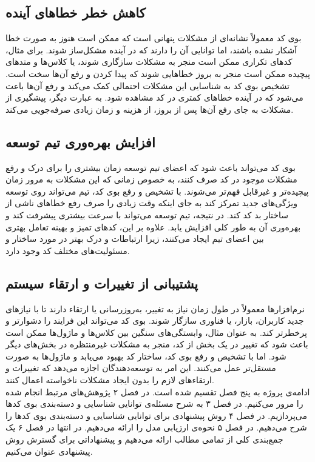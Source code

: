 \subsection{کاهش خطر خطاهای آینده}
بوی کد معمولاً نشانه‌ای از مشکلات پنهانی است که ممکن است هنوز به صورت خطا آشکار نشده باشند، اما توانایی آن را دارند که در آینده مشکل‌ساز شوند. برای مثال، کدهای تکراری ممکن است منجر به مشکلات سازگاری شوند، یا کلاس‌ها و متدهای پیچیده ممکن است منجر به بروز خطاهایی شوند که پیدا کردن و رفع آن‌ها سخت است. تشخیص بوی کد به شناسایی این مشکلات احتمالی کمک می‌کند و رفع آن‌ها باعث می‌شود که در آینده خطاهای کمتری در کد مشاهده شود. به عبارت دیگر، پیشگیری از مشکلات به جای رفع آن‌ها پس از بروز، از هزینه و زمان زیادی صرفه‌جویی می‌کند.
\subsection{افزایش بهره‌وری تیم توسعه}
بوی کد می‌تواند باعث شود که اعضای تیم توسعه زمان بیشتری را برای درک و رفع مشکلات موجود در کد صرف کنند، به خصوص زمانی که این مشکلات به مرور زمان پیچیده‌تر و غیرقابل فهم‌تر می‌شوند. با تشخیص و رفع بوی کد، تیم می‌تواند روی توسعه ویژگی‌های جدید تمرکز کند به جای اینکه وقت زیادی را صرف رفع خطاهای ناشی از ساختار بد کد کند. در نتیجه، تیم توسعه می‌تواند با سرعت بیشتری پیشرفت کند و بهره‌وری آن به طور کلی افزایش یابد. علاوه بر این، کدهای تمیز و بهینه تعامل بهتری بین اعضای تیم ایجاد می‌کنند، زیرا ارتباطات و درک بهتر در مورد ساختار و مسئولیت‌های مختلف کد وجود دارد.
\subsection {پشتیبانی از تغییرات و ارتقاء سیستم}
نرم‌افزارها معمولاً در طول زمان نیاز به تغییر، به‌روزرسانی یا ارتقاء دارند تا با نیازهای جدید کاربران، بازار، یا فناوری سازگار شوند. بوی کد می‌تواند این فرایند را دشوارتر و پرخطرتر کند. به عنوان مثال، وابستگی‌های سنگین بین کلاس‌ها و ماژول‌ها ممکن است باعث شود که تغییر در یک بخش از کد، منجر به مشکلات غیرمنتظره در بخش‌های دیگر شود. اما با تشخیص و رفع بوی کد، ساختار کد بهبود می‌یابد و ماژول‌ها به صورت مستقل‌تر عمل می‌کنند. این امر به توسعه‌دهندگان اجازه می‌دهد که تغییرات و ارتقاءهای لازم را بدون ایجاد مشکلات ناخواسته اعمال کنند.
\\
ادامه‌ی پروژه به پنج فصل تقسیم شده است. در فصل ۲ پژوهش‌های مرتبط انجام شده را مرور می‌کنیم. در فصل ۳ به شرح مسئله‌ی توانایی شناسایی و دسته‌بندی بوی کدها می‌پردازیم. در فصل ۴ روش پیشنهادی برای توانایی شناسایی و دسته‌بندی بوی کدها را شرح می‌دهیم. در فصل ۵ نحوه‌ی ارزیابی مدل را ارائه می‌دهیم. در انتها در فصل ۶ یک جمع‌بندی کلی از تمامی مطالب ارائه می‌دهیم و پیشنهاداتی برای گسترش روش پیشنهادی عنوان می‌کنیم.

\clearpage

